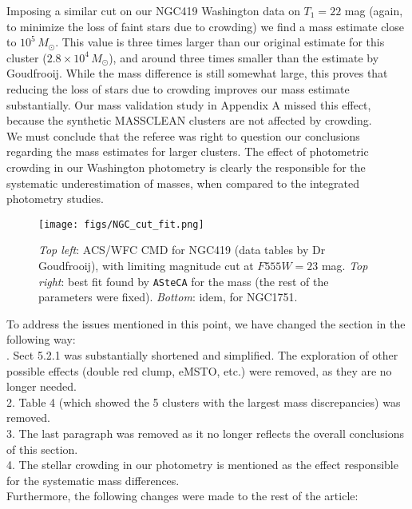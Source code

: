 \documentclass{article}
\begin{document}
Imposing a similar cut on our NGC419 Washington data on $T_1{=}22$ mag (again,
to minimize the loss of faint stars due to crowding) we find a mass estimate
close to $10^5\,M_{\odot}$. This value is three times larger than our original
estimate for this cluster ($2.8{\times}10^4\,M_{\odot}$), and around three times
smaller than the estimate by Goudfrooij.
While the mass difference is still somewhat large, this proves that reducing the
loss of stars due to crowding improves our mass estimate substantially.
Our mass validation study in Appendix A missed this effect, because the synthetic
MASSCLEAN clusters are not affected by crowding.\\

We must conclude that the referee was right to question our conclusions
regarding the mass estimates for larger clusters. The effect of photometric
crowding in our Washington photometry is clearly the responsible for the
systematic underestimation of masses, when compared to the integrated photometry
studies.\\

\begin{figure}[t]
    \centering
    \texttt{[image: figs/NGC\_cut\_fit.png]}
    \caption{\emph{Top left}: ACS/WFC CMD for NGC419 (data tables by Dr
    Goudfrooij), with limiting magnitude cut at $F555W=23$ mag. \emph{Top right}:
    best fit found by \texttt{ASteCA} for the mass (the rest of the parameters
    were fixed).
    \emph{Bottom}: idem, for NGC1751.}
    \label{fig:NGC_fit}
\end{figure}

To address the issues mentioned in this point, we have changed the
section in the following way:\\

. Sect 5.2.1 was substantially shortened and simplified. The
exploration of other possible effects (double red clump, eMSTO, etc.) were
removed, as they are no longer needed.\\
2. Table 4 (which showed the 5 clusters with the largest mass discrepancies) was
removed.\\
3. The last paragraph was removed as it no longer reflects the overall
conclusions of this section.\\
4. The stellar crowding in our photometry is mentioned as the effect responsible
for the systematic mass differences.\\

Furthermore, the following changes were made to the rest of the article:\\
\end{document}
